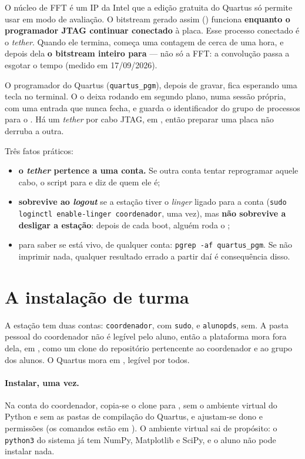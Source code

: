 O núcleo de FFT é um IP da Intel que a edição gratuita do Quartus só permite
usar em modo de avaliação. O bitstream gerado assim
() funciona \textbf{enquanto o programador
JTAG continuar conectado} à placa. Esse processo conectado é o \emph{tether}.
Quando ele termina, começa uma contagem de cerca de uma hora, e depois dela
\textbf{o bitstream inteiro para} --- não só a FFT: a convolução passa a
esgotar o tempo (medido em 17/09/2026).

O programador do Quartus (\texttt{quartus\_pgm}), depois de gravar, fica
esperando uma tecla no terminal. O  o deixa rodando em
segundo plano, numa sessão própria, com uma entrada que nunca fecha, e guarda o
identificador do grupo de processos para o . Há um \emph{tether} por
cabo JTAG, em , então preparar uma placa não
derruba a outra.

Três fatos práticos:

\begin{itemize}
  \item \textbf{o \emph{tether} pertence a uma conta.} Se outra conta tentar
    reprogramar aquele cabo, o script para e diz de quem ele é;
  \item \textbf{sobrevive ao \emph{logout}} se a estação tiver o
    \emph{linger} ligado para a conta (\texttt{sudo loginctl enable-linger
    coordenador}, uma vez), mas \textbf{não sobrevive a desligar a estação}:
    depois de cada boot, alguém roda o ;
  \item para saber se está vivo, de qualquer conta: \texttt{pgrep -af
    quartus\_pgm}. Se não imprimir nada, qualquer resultado errado a partir daí
    é consequência disso.
\end{itemize}

\section{A instalação de turma}
\label{sec:turma}

A estação tem duas contas: \texttt{coordenador}, com \texttt{sudo}, e
\texttt{alunopds}, sem. A pasta pessoal do coordenador não é legível pelo aluno,
então a plataforma mora fora dela, em , como um clone do
repositório pertencente ao coordenador e ao grupo dos alunos. O Quartus mora em
, legível por todos.

\paragraph{Instalar, uma vez.} Na conta do coordenador, copia-se o clone para
, sem o ambiente virtual do Python e sem as pastas de
compilação do Quartus, e ajustam-se dono e permissões (os comandos estão em
). O ambiente virtual sai de propósito: o \texttt{python3} do
sistema já tem NumPy, Matplotlib e SciPy, e o aluno não pode instalar nada.

